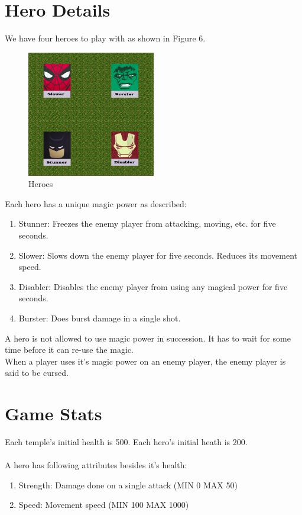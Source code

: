 \documentclass[a4paper]{article}
\begin{document}
\section{Hero Details}
We have four heroes to play with as shown in Figure 6.\\

\begin{figure}[htp]
\centering
\includegraphics[width=0.5\textwidth]{Heros.png}
\caption{\label{fig:heroes}Heroes}
\end{figure}

Each hero has a unique magic power as described:
\begin{enumerate}
\item Stunner: Freezes the enemy player from attacking, moving, etc. for five seconds.
\item Slower: Slows down the enemy player for five seconds. Reduces its movement speed.
\item Disabler: Disables the enemy player from using any magical power for five seconds.
\item Burster: Does burst damage in a single shot.
\end{enumerate}

A hero is not allowed to use magic power in succession. It has to wait for some time before it can re-use the magic. \\

When a player uses it’s magic power on an enemy player, the enemy player is said to be cursed.

\section{Game Stats}
Each temple’s initial health is 500. Each hero’s initial heath is 200.
\\ \\
A hero has following attributes besides it’s health:
\begin{enumerate}
\item Strength: Damage done on a single attack (MIN 0 MAX 50)
\item Speed: Movement speed (MIN 100 MAX 1000)
\end{enumerate}
\end{document}
